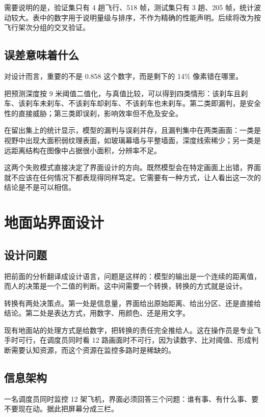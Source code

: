 \documentclass[12pt,a4paper]{ctexart}
\begin{document}
需要说明的是，验证集只有 4 趟飞行、518 帧，测试集只有 3 趟、205 帧，统计波动较大。表中的数字用于说明量级与排序，不作为精确的性能声明。后续将改为按飞行架次分组的交叉验证。

\subsection{误差意味着什么}

对设计而言，重要的不是 0.858 这个数字，而是剩下的 14\% 像素错在哪里。

把预测深度按 9 米阈值二值化，与真值比较，可以得到四类情形：该刹车且刹车、该刹车未刹车、不该刹车却刹车、不该刹车也未刹车。第二类即漏判，是安全性的直接威胁；第三类即误刹，影响效率但不危及安全。

在留出集上的统计显示，模型的漏判与误刹并存，且漏判集中在两类画面：一类是视野中出现大面积弱纹理表面，如玻璃幕墙与平整墙面，深度线索稀少；另一类是远距离结构在图像中占据很小面积，分辨率不足。

这两个失败模式直接决定了界面设计的方向。既然模型会在特定画面上出错，界面就不应该在任何情况下都表现得同样笃定。它需要有一种方式，让人看出这一次的结论是不是可以相信。

\section{地面站界面设计}

\subsection{设计问题}

把前面的分析翻译成设计语言，问题是这样的：模型的输出是一个连续的距离值，而人的决策是一个二值的判断。这中间需要一个转换，转换的方式就是设计。

转换有两处决策点。第一处是信息量，界面给出原始距离、给出分区、还是直接给结论。第二处是表达方式，用数字、用颜色、还是用文字。

现有地面站的处理方式是给数字，把转换的责任完全推给人。这在操作员是专业飞手时可行，在调度员同时看 12 路画面时不可行，因为读数字、比对阈值、形成判断需要认知资源，而这个资源在监控多路时是稀缺的。

\subsection{信息架构}

一名调度员同时监控 12 架飞机，界面必须回答三个问题：谁有事、有什么事、要不要现在动。据此把屏幕分成三栏。
\end{document}
